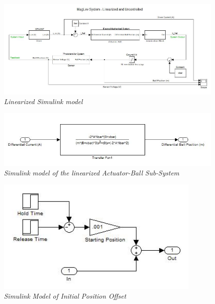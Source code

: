 \documentclass{article}
\theoremstyle{plain}
\theoremstyle{definition}
\theoremstyle{remark}
\begin{document}

\begin{figure}
\begin{center}
\includegraphics[width = 15cm]{LinearUnControlledComplete.jpg}
\caption{\emph{Linearized Simulink model}}
\label{Q1_e6}
\end{center}
\end{figure}

\begin{figure}
\begin{center}
\includegraphics[width = 15cm]{LinearUnControlledActuatorBall.jpg}
\caption{\emph{Simulink model of the linearized Actuator-Ball Sub-System}}
\label{Q1_e7}
\end{center}
\end{figure}

\begin{figure}
\begin{center}
\includegraphics[width = 10cm]{LinearUnControlledInitialization.jpg}
\caption{\emph{Simulink Model of Initial Position Offset}}
\label{Q1_e8}
\end{center}
\end{figure}
\end{document}
